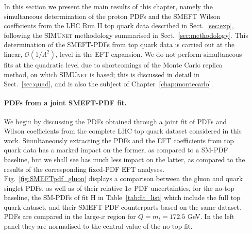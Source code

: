 \documentclass[withindex,glossary]{cam-thesis}
\newcommand{\simunet}{\textsc{SIMUnet}}
\begin{document}
In this section we present the main results of this chapter, namely
the simultaneous determination of the proton PDFs and the SMEFT Wilson coefficients
from the LHC Run II top quark data described in Sect.~\ref{sec:exp},
following the \simunet{} methodology summarised in Sect.~\ref{sec:methodology}.
%
This determination of the SMEFT-PDFs from top quark data is carried
out at the linear, $\mathcal{O}(1/\Lambda^2)$, level in the EFT expansion.
We do not perform simultaneous fits at the quadratic level due to
shortcomings of the Monte Carlo replica method, on which
\simunet{} is based; this is discussed in detail in Sect.~\ref{sec:quad}, and
is also the subject of Chapter~\ref{chap:montecarlo}.

\paragraph{PDFs from a joint SMEFT-PDF fit.} We begin by discussing the PDFs obtained through a
joint fit of PDFs and Wilson coefficients
from the complete LHC top quark dataset considered in this work.
%
Simultaneously extracting the PDFs and the EFT coefficients
from top quark data has a marked impact on the former, as compared to a SM-PDF
baseline, but we shall see has much less impact on the latter, as compared to the results of the
corresponding fixed-PDF EFT analyses.
%
Fig.~\ref{fig:SMEFTpdf_gluon}
displays a comparison between the gluon and quark singlet PDFs, as
well as of their relative $1\sigma$ PDF uncertainties, for 
the no-top baseline, the SM-PDFs of
fit H in Table~\ref{tab:fit_list} which include
the full top quark dataset, and their SMEFT-PDF counterparts based
on the same dataset.
%
PDFs are compared in the large-$x$ region for   $Q=m_t=172.5$ GeV. In
the left panel they are normalised to the central value of the
no-top fit.
\end{document}
